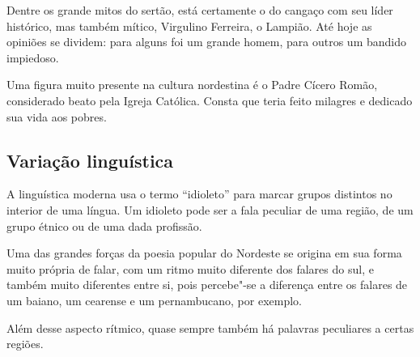 Dentre os grande mitos do sertão, está certamente o do cangaço com seu
líder histórico, mas também mítico, Virgulino Ferreira, o Lampião. Até
hoje as opiniões se dividem: para alguns foi um grande homem, para
outros um bandido impiedoso. 

Uma figura muito presente na cultura nordestina é o Padre Cícero Romão,
considerado beato pela Igreja Católica. Consta que teria feito milagres
e dedicado sua vida aos pobres. 

\subsection{Variação linguística}

A linguística moderna usa o termo
``idioleto'' para marcar grupos
distintos no interior de uma língua. Um idioleto pode ser a fala
peculiar de uma região, de um grupo étnico ou de uma dada profissão. 

Uma das grandes forças da poesia popular do Nordeste se origina em sua
forma muito própria de falar, com um ritmo muito diferente dos falares
do sul, e também muito diferentes entre si, pois percebe"-se a diferença
entre os falares de um baiano, um cearense e um pernambucano, por
exemplo.

Além desse aspecto rítmico, quase sempre também há palavras peculiares a
certas regiões. 

